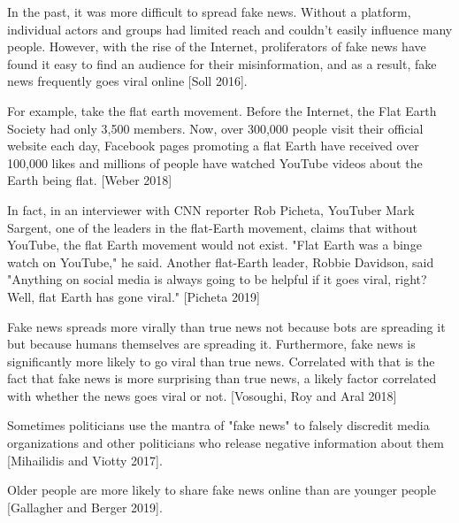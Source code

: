 \documentclass[class=book, crop=false]{standalone}
\begin{document}
In the past, it was more difficult to spread fake news. Without a platform, individual actors and groups had limited reach and couldn't easily influence many people. However, with the rise of the Internet, proliferators of fake news have found it easy to find an audience for their misinformation, and as a result, fake news frequently goes viral online [Soll 2016].

For example, take the flat earth movement. Before the Internet, the Flat Earth Society had only 3,500 members. Now, over 300,000 people visit their official website each day, Facebook pages promoting a flat Earth have received over 100,000 likes and millions of people have watched YouTube videos about the Earth being flat. [Weber 2018]

In fact, in an interviewer with CNN reporter Rob Picheta, YouTuber Mark Sargent, one of the leaders in the flat-Earth movement, claims that without YouTube, the flat Earth movement would not exist. "Flat Earth was a binge watch on YouTube," he said. Another flat-Earth leader, Robbie Davidson, said "Anything on social media is always going to be helpful if it goes viral, right? Well, flat Earth has gone viral." [Picheta 2019]

Fake news spreads more virally than true news not because bots are spreading it but because humans themselves are spreading it. Furthermore, fake news is significantly more likely to go viral than true news. Correlated with that is the fact that fake news is more surprising than true news, a likely factor correlated with whether the news goes viral or not. [Vosoughi, Roy and Aral 2018]

Sometimes politicians use the mantra of "fake news" to falsely discredit media organizations and other politicians who release negative information about them [Mihailidis and Viotty 2017].

Older people are more likely to share fake news online than are younger people [Gallagher and Berger 2019].
\end{document}
